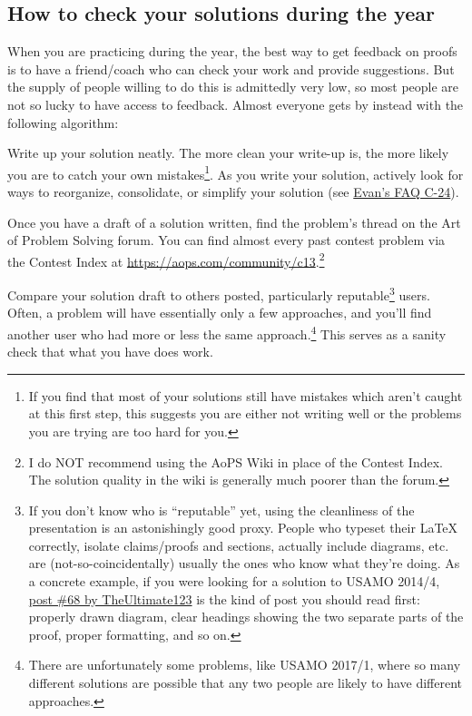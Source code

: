 \documentclass[11pt]{scrartcl}
\begin{document}
\subsection{How to check your solutions during the year}
When you are practicing during the year,
the best way to get feedback on proofs is to have a friend/coach
who can check your work and provide suggestions.
But the supply of people willing to do this is admittedly very low,
so most people are not so lucky to have access to feedback.
Almost everyone gets by instead with the following algorithm:
\begin{description}
  \ii[Step 1.] Write up your solution neatly.
  The more clean your write-up is, the more likely you are to catch
  your own mistakes\footnote{If you find that most of your solutions
    still have mistakes which aren't caught at this first step,
    this suggests you are either not writing well
    or the problems you are trying are too hard for you.}.
  As you write your solution, actively look for ways to
  reorganize, consolidate, or simplify your solution
  (see \href{https://web.evanchen.cc/faq-contest.html#C-24}{Evan's FAQ C-24}).

  \ii[Step 2.] Once you have a draft of a solution written,
  find the problem's thread on the Art of Problem Solving forum.
  You can find almost every past contest problem via the Contest Index at
  \url{https://aops.com/community/c13}.\footnote{I
    do NOT recommend using the AoPS Wiki in place of the Contest Index.
    The solution quality in the wiki is generally much poorer than the forum.}

  Compare your solution draft to others posted,
  particularly reputable\footnote{If you don't know who is ``reputable'' yet,
    using the cleanliness of the presentation is an astonishingly good proxy.
    People who typeset their LaTeX correctly,
    isolate claims/proofs and sections, actually include diagrams, etc.
    are (not-so-coincidentally) usually the ones who know what they're doing.
    As a concrete example, if you were looking for a solution to USAMO 2014/4,
    \href{https://aops.com/community/p15752333}{post \#68 by TheUltimate123}
    is the kind of post you should read first: properly drawn diagram,
    clear headings showing the two separate parts of the proof,
    proper formatting, and so on.} users.
  Often, a problem will have essentially only a few approaches,
  and you'll find another user who had more or less
  the same approach.\footnote{There are unfortunately some problems,
    like USAMO 2017/1, where so many different solutions are possible
    that any two people are likely to have different approaches.}
  This serves as a sanity check that what you have does work.


\end{description}
\end{document}
